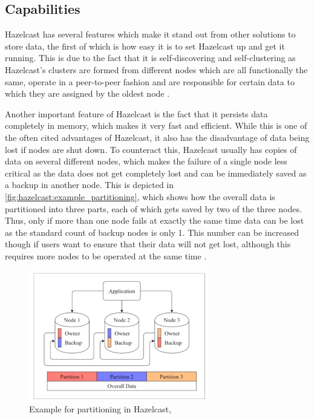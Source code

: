 \subsection{Capabilities} \label{subsec:capabilitiesHazelcast}

Hazelcast has several features which make it stand out from other solutions to store data, the first of which is how easy it is
to set Hazelcast up and get it running. This is due to the fact that it is self-discovering and self-clustering as Hazelcast's
clusters are formed from different nodes which are all functionally the same, operate in a peer-to-peer fashion and are responsible for
certain data to which they are assigned by the oldest node \parencite{Johns.2015}.

Another important feature of Hazelcast is the fact that it persists data completely in memory, which makes it very fast and efficient.
While this is one of the often cited advantages of Hazelcast, it also has the disadvantage of data being lost if nodes are shut down. To counteract this, Hazelcast usually has copies of data on several different nodes, which
makes the failure of a single node less critical as the data does not get completely lost and can be immediately saved as a backup
in another node. This is depicted in \autoref{fig:hazelcast:example_partitioning}, which shows how the overall data is partitioned into three parts, each of which gets saved by two of the three nodes. Thus, only if more than
one node fails at exactly the same time data can be lost as the standard count of backup nodes is only 1. This number can be increased though if users want to
ensure that their data will not get lost, although this requires more nodes to be operated at the same time \parencite{Johns.2015}.

\begin{figure}[H]
    \centering
    \caption[Example for partitioning in Hazelcast]{Example for partitioning in Hazelcast, \parencite{Johns.2015}} \label{fig:hazelcast:example_partitioning}
    \includegraphics[width=0.7\textwidth]{images/hazelcast_partitioning.png}
\end{figure}

